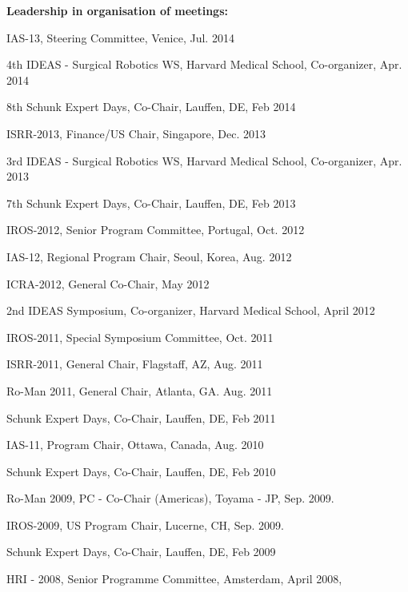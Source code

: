 \documentclass{article}
\begin{document}
\begin{cv}
\begin{cvlist}{\bf Leadership in organisation of meetings:}
		\item IAS-13, Steering Committee, Venice, \cftdotfill{\cftdotsep} Jul. 2014
		\item 4th IDEAS - Surgical Robotics WS, Harvard Medical School, Co-organizer,
		\cftdotfill{\cftdotsep} Apr. 2014
		\item 8th Schunk Expert Days, Co-Chair, Lauffen, DE, \cftdotfill{\cftdotsep}
		Feb 2014
		\item ISRR-2013, Finance/US Chair, Singapore, \cftdotfill{\cftdotsep} Dec.
		2013
		\item 3rd IDEAS - Surgical Robotics WS, Harvard Medical School, Co-organizer,
		\cftdotfill{\cftdotsep} Apr. 2013
		\item 7th Schunk Expert Days, Co-Chair, Lauffen, DE, \cftdotfill{\cftdotsep}
		Feb 2013
		\item IROS-2012, Senior Program Committee, Portugal,\cftdotfill{\cftdotsep}
		Oct. 2012
		\item IAS-12, Regional Program Chair, Seoul, Korea, \cftdotfill{\cftdotsep}
		Aug. 2012
		\item ICRA-2012, General Co-Chair, \cftdotfill{\cftdotsep} May 2012
		\item 2nd IDEAS Symposium, Co-organizer, Harvard Medical School,
		\cftdotfill{\cftdotsep} April 2012
		\item IROS-2011, Special Symposium Committee, \cftdotfill{\cftdotsep} Oct.
		2011
		\item ISRR-2011, General Chair, Flagstaff, AZ, \cftdotfill{\cftdotsep} Aug.
		2011
		\item Ro-Man 2011, General Chair, Atlanta, GA. \cftdotfill{\cftdotsep} Aug.
		2011
		\item Schunk Expert Days, Co-Chair, Lauffen, DE, \cftdotfill{\cftdotsep} Feb
		2011
		\item IAS-11, Program Chair, Ottawa, Canada, \cftdotfill{\cftdotsep} Aug. 2010
		\item Schunk Expert Days, Co-Chair, Lauffen, DE, \cftdotfill{\cftdotsep} Feb
		2010
		\item Ro-Man 2009, PC - Co-Chair (Americas), Toyama - JP,
		\cftdotfill{\cftdotsep} Sep. 2009.
		\item IROS-2009, US Program Chair, Lucerne, CH, \cftdotfill{\cftdotsep} Sep.
		2009.
		\item Schunk Expert Days, Co-Chair, Lauffen, DE, \cftdotfill{\cftdotsep} Feb
		2009
		\item HRI - 2008, Senior Programme Committee, Amsterdam,
		\cftdotfill{\cftdotsep} April 2008,

\end{cvlist}
\end{cv}
\end{document}
